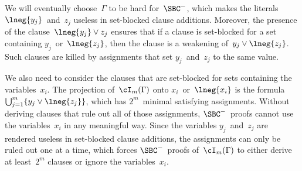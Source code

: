 \documentclass[10pt,a4paper]{article}
\begin{document}
We will eventually choose~$\Gamma$ to be hard for~$\SBC^-$,
which makes the literals $\lneg{y_j}$~and~$z_j$
useless in set-blocked clause additions.
Moreover, the presence of the clause~$\lneg{y_j} \lor z_j$ ensures that
if a clause is set-blocked for a set containing $y_j$~or~$\lneg{z_j}$,
then the clause is a weakening of~$y_j \lor \lneg{z_j}$.
Such clauses are killed by assignments
that set $y_j$~and~$z_j$ to the same value.

We also need to consider the clauses that are set-blocked
for sets containing the variables~$x_i$.
The projection of~$\cI_m(\Gamma)$ onto $x_i$~or~$\lneg{x_i}$
is the formula~$\bigcup_{j = 1}^m \{y_j \lor \lneg{z_j}\}$,
which has $2^m$~minimal satisfying assignments.
Without deriving clauses that rule out all of those assignments,
$\SBC^-$~proofs cannot use the variables~$x_i$ in any meaningful way.
Since the variables $y_j$~and~$z_j$
are rendered useless in set-blocked clause additions,
the assignments can only be ruled out one at a time,
which forces $\SBC^-$~proofs of~$\cI_m(\Gamma)$
to either derive at least~$2^m$ clauses or ignore the variables~$x_i$.
\end{document}
